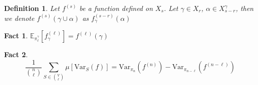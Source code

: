 \documentclass{article}
\newtheorem{define}{Definition}[section]
\newtheorem{fact}{Fact}[section]
\def\Var{\mathrm{Var}}
\def\E{\mathbb{E}}
\begin{document}
\begin{define}
  Let $f^{(s)}$ be a function defined on $X_s$.
  Let $\gamma \in X_r$, $\alpha \in X^\gamma_{s-r}$, then we denote $f^{(s)}(\gamma\cup \alpha)$ as $f^{(s - r)}_\gamma(\alpha)$
\end{define}

\begin{fact}
  $\E_{\pi^\gamma_\ell}[f^{(\ell)}_\gamma] = f^{(\ell)}(\gamma)$
\end{fact}

\begin{fact}
  \[\frac{1}{\binom{n}{\ell}} \sum_{S\in\binom{V}{\ell}} \mu[\Var_S(f)] = \Var_{\pi_n}(f^{(n)}) - \Var_{\pi_{n-\ell}}(f^{(n-\ell)})\]
\end{fact}

\clearpage


\end{document}

